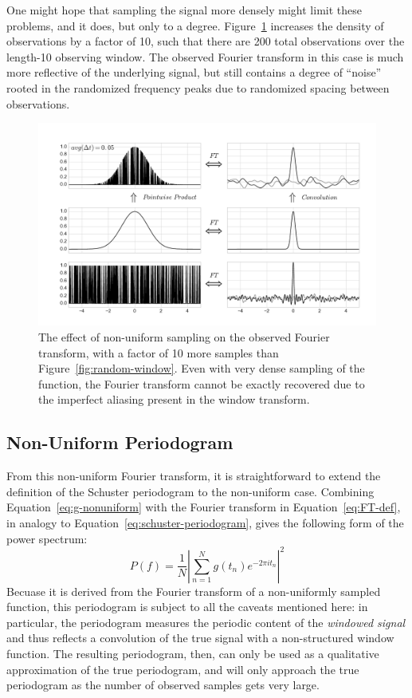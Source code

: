 \documentclass[preprint]{aastex}
\newcommand{\Fig}[1]{Figure~\ref{fig:#1}}
\newcommand{\fig}[1]{Figure~\ref{fig:#1}}
\newcommand{\figlabel}[1]{\label{fig:#1}}
\newcommand{\Eq}[1]{Equation~\ref{eq:#1}}
\newcommand{\eq}[1]{\Eq{#1}}
\begin{document}
One might hope that sampling the signal more densely might limit these problems,
and it does, but only to a degree.
\Fig{random-window-2} increases the density of observations by a factor of 10,
such that there are 200 total observations over the length-10 observing window.
The observed Fourier transform in this case is much more reflective of the
underlying signal, but still contains a degree of ``noise'' rooted in the
randomized frequency peaks due to randomized spacing between observations.

\begin{figure}[ht]
  \centering
  \includegraphics[width=\textwidth]{fig11_random_window_2}
  \caption{The effect of non-uniform sampling on the observed Fourier transform,
    with a factor of 10 more samples than \fig{random-window}.
    Even with very dense sampling of the function, the Fourier transform
    cannot be exactly recovered due to the imperfect aliasing present in
    the window transform.
    \figlabel{random-window-2}}
\end{figure}

\subsection{Non-Uniform Periodogram}

From this non-uniform Fourier transform, it is straightforward to extend the
definition of the Schuster periodogram to the non-uniform case.
Combining \eq{g-nonuniform} with the Fourier transform in \eq{FT-def}, in analogy to \eq{schuster-periodogram}, gives the following form of the power spectrum:
\begin{equation}
  P(f) = \frac{1}{N}\left|\sum_{n=1}^N g(t_n)e^{-2\pi i t_n} \right|^2
\end{equation}
Becuase it is derived from the Fourier transform of a non-uniformly sampled
function, this periodogram is subject to all the caveats mentioned here: in
particular, the periodogram measures the periodic content of the
{\it windowed signal} and thus reflects a convolution of the true signal
with a non-structured window function.
The resulting periodogram, then, can only be used as a qualitative approximation
of the true periodogram, and will only approach the true periodogram as the
number of observed samples gets very large.
\end{document}
